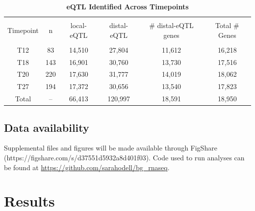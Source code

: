 \documentclass[article,9pt,twocolumn,twoside]{rilabRxiv}
\begin{document}
\begin{table}[!t]
    \centering
    \caption{\textbf{eQTL Identified Across Timepoints} \label{tab:eqtltable}}
    \begin{adjustbox}{max width=0.9\textwidth,center}
    \begin{tabular}{c c c c c c}
    \hline \\
    Timepoint & n & local-eQTL & distal-eQTL & \# distal-eQTL genes & Total \# Genes \\
    \hline \\
     T12 & 83 & 14,510 & 27,804 & 11,612 & 16,218\\
     T18 & 143 & 16,901 & 30,760 & 13,730 & 17,516\\
     T20 & 220 & 17,630 & 31,777 & 14,019 & 18,062\\
     T27 & 194 & 17,372 & 30,656 & 13,540 & 17,823\\
     Total & -- & 66,413 & 120,997 & 18,591 & 18,950 \\
     \hline
    \end{tabular}
    \end{adjustbox}
\end{table}


\subsection{Data availability}
Supplemental files and figures will be made available through FigShare (https://figshare.com/s/d37551d5932a8d401f03).
Code used to run analyses can be found at \url{https://github.com/sarahodell/bg_rnaseq}.

\section{Results}
\end{document}
